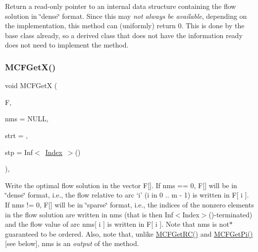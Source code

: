 Return a read-\/only pointer to an internal data structure containing the flow solution in \char`\"{}dense\char`\"{} format. Since this may {\itshape not always be available}, depending on the implementation, this method can (uniformly) return 0. This is done by the base class already, so a derived class that does not have the information ready does not need to implement the method. \mbox{\label{class_m_c_f_simplex_adfe83485d41648441446726b336069d1}} 
\subsubsection{\texorpdfstring{M\+C\+F\+Get\+X()}{MCFGetX()}\hspace{0.1cm}{\footnotesize\ttfamily [3/3]}}
{\footnotesize\ttfamily void M\+C\+F\+GetX (\begin{DoxyParamCaption}\item[{\mbox{\hyperlink{class_m_c_f_class_a9dae1f1a39c208ce3c2b337cd5bb3d00}{F\+Row}}}]{F,  }\item[{\mbox{\hyperlink{class_m_c_f_class_ace3388eb329ff0551a0b86b6c67e33d8}{Index\+\_\+\+Set}}}]{nms = {\ttfamily NULL},  }\item[{\mbox{\hyperlink{class_m_c_f_class_a76aaabb20535c51a2752b93f6c38fe54}{c\+Index}}}]{strt = {},  }\item[{\mbox{\hyperlink{class_m_c_f_class_ad53d6229d7ec28555a9c9c2fd9abf773}{Index}}}]{stp = {\ttfamily Inf$<$~\mbox{\hyperlink{class_m_c_f_class_ad53d6229d7ec28555a9c9c2fd9abf773}{Index}}~$>$()} }\end{DoxyParamCaption})\hspace{0.3cm}{\ttfamily [override]}, {\ttfamily [virtual]}}

Write the optimal flow solution in the vector F\mbox{[}\mbox{]}. If nms == 0, F\mbox{[}\mbox{]} will be in \char`\"{}dense\char`\"{} format, i.\+e., the flow relative to arc `i' (i in 0 .. m -\/ 1) is written in F\mbox{[} i \mbox{]}. If nms != 0, F\mbox{[}\mbox{]} will be in \char`\"{}sparse\char`\"{} format, i.\+e., the indices of the nonzero elements in the flow solution are written in nms (that is then Inf$<$\+Index$>$()-\/terminated) and the flow value of arc nms\mbox{[} i \mbox{]} is written in F\mbox{[} i \mbox{]}. Note that nms is not$\ast$ guaranteed to be ordered. Also, note that, unlike \mbox{\hyperlink{class_m_c_f_class_af027cee8179a876a4879c73820c380d1}{M\+C\+F\+Get\+R\+C()}} and \mbox{\hyperlink{class_m_c_f_class_a8f1a95d5c707f83ffc6aecba1e7e0e10}{M\+C\+F\+Get\+Pi()}} \mbox{[}see below\mbox{]}, nms is an {\itshape output} of the method.

